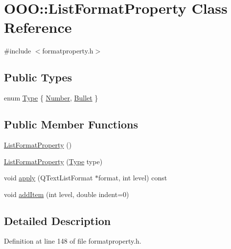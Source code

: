 \hypertarget{classOOO_1_1ListFormatProperty}{\section{O\+O\+O\+:\+:List\+Format\+Property Class Reference}
\label{classOOO_1_1ListFormatProperty}
}


{\ttfamily \#include $<$formatproperty.\+h$>$}

\subsection*{Public Types}
\begin{DoxyCompactItemize}
\item 
enum \hyperlink{classOOO_1_1ListFormatProperty_ade7ec3de6e5f2d3e70ea0f7957bf6f78}{Type} \{ \hyperlink{classOOO_1_1ListFormatProperty_ade7ec3de6e5f2d3e70ea0f7957bf6f78a914b0896543559de81a64c4d976044fe}{Number}, 
\hyperlink{classOOO_1_1ListFormatProperty_ade7ec3de6e5f2d3e70ea0f7957bf6f78a4873cf9ff40610a812d97f7fd08b61ab}{Bullet}
 \}
\end{DoxyCompactItemize}
\subsection*{Public Member Functions}
\begin{DoxyCompactItemize}
\item 
\hyperlink{classOOO_1_1ListFormatProperty_a969ba6a166bc2cb9c4ff0516506dae6a}{List\+Format\+Property} ()
\item 
\hyperlink{classOOO_1_1ListFormatProperty_acf36551f2c739d74b7381c04f6b75f62}{List\+Format\+Property} (\hyperlink{classOOO_1_1ListFormatProperty_ade7ec3de6e5f2d3e70ea0f7957bf6f78}{Type} type)
\item 
void \hyperlink{classOOO_1_1ListFormatProperty_ae9fd663fd484d7be4569c16238244f4f}{apply} (Q\+Text\+List\+Format $\ast$format, int level) const 
\item 
void \hyperlink{classOOO_1_1ListFormatProperty_aec8eb60abaf72270dbc02e64b1b1974d}{add\+Item} (int level, double indent=0)
\end{DoxyCompactItemize}


\subsection{Detailed Description}


Definition at line 148 of file formatproperty.\+h.



